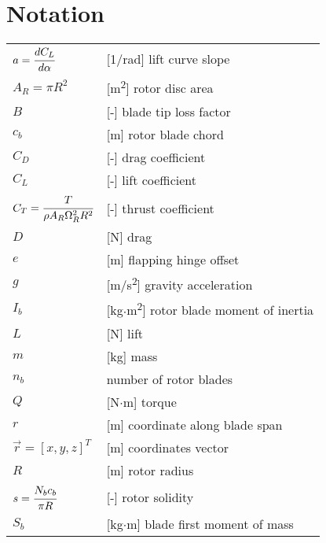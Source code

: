 \clearpage %
{}
\chapter*{Notation}
\markright{}

\begin{longtable}[l]{ l p{} }
  $a=\cfrac{dC_L}{d \alpha}$                 & [1/rad] lift curve slope \\
  $A_R=\pi R^2$                              & [m\textsuperscript{2}] rotor disc area \\
  $B$                                        & [-] blade tip loss factor \\
  $c_b$                                      & [m] rotor blade chord \\
  $C_D$                                      & [-] drag coefficient \\
  $C_L$                                      & [-] lift coefficient \\
  $C_T=\cfrac{T}{\rho A_R \Omega_R^2 R^2}$   & [-] thrust coefficient \\
  $D$                                        & [N] drag \\
  $e$                                        & [m] flapping hinge offset \\
  $g$                                        & [m/s\textsuperscript{2}] gravity acceleration \\
  $I_b$                                      & [kg$\cdot$m\textsuperscript{2}] rotor blade moment of inertia \\
  $L$                                        & [N] lift \\
  $m$                                        & [kg] mass \\
  $n_b$                                      & number of rotor blades \\
  $Q$                                        & [N$\cdot$m] torque \\
  $r$                                        & [m] coordinate along blade span \\
  $\vec r=\left[ x, y, z \right]^T$          & [m] coordinates vector \\
  $R$                                        & [m] rotor radius \\
  $s=\cfrac{N_b c_b}{\pi R}$                 & [-] rotor solidity \\
  $S_b$                                      & [kg$\cdot$m] blade first moment of mass \\

\end{longtable}
